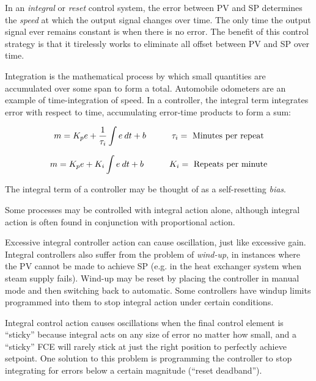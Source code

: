 







In an {\it integral} or {\it reset} control system, the error between PV and SP determines the {\it speed} at which the output signal changes over time.  The only time the output signal ever remains constant is when there is no error.  The benefit of this control strategy is that it tirelessly works to eliminate all offset between PV and SP over time.

\vskip 10pt

Integration is the mathematical process by which small quantities are accumulated over some span to form a total.  Automobile odometers are an example of time-integration of speed.  In a controller, the integral term integrates error with respect to time, accumulating error-time products to form a sum:

$$m = K_p e + {1 \over \tau_i} \int e \> dt + b \hskip 30pt \tau_i = \hbox{ Minutes per repeat}$$

$$m = K_p e + K_i \int e \> dt + b \hskip 30pt K_i = \hbox{ Repeats per minute}$$

The integral term of a controller may be thought of as a self-resetting {\it bias}.

\vskip 10pt

Some processes may be controlled with integral action alone, although integral action is often found in conjunction with proportional action.  

\vskip 10pt

Excessive integral controller action can cause oscillation, just like excessive gain.  Integral controllers also suffer from the problem of {\it wind-up}, in instances where the PV cannot be made to achieve SP (e.g. in the heat exchanger system when steam supply fails).  Wind-up may be reset by placing the controller in manual mode and then switching back to automatic.  Some controllers have windup limits programmed into them to stop integral action under certain conditions.

\vskip 10pt

Integral control action causes oscillations when the final control element is ``sticky'' because integral acts on any size of error no matter how small, and a ``sticky'' FCE will rarely stick at just the right position to perfectly achieve setpoint.  One solution to this problem is programming the controller to stop integrating for errors below a certain magnitude (``reset deadband'').  







